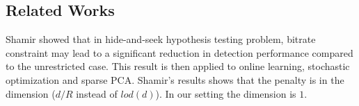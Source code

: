 \documentclass[letterpaper, conference]{IEEEtran}      %
\begin{document}
%


\subsection*{Related Works}
{\color{red} Shamir \cite{Shamir} showed that in hide-and-seek hypothesis testing problem, bitrate constraint may lead to a significant reduction in detection performance compared to the unrestricted case. This result is then applied to online learning, stochastic optimization and sparse PCA. Shamir's results shows that the penalty is in the dimension ($d/R$ instead of $lod(d)$). In our setting the dimension is $1$.} \\
\end{document}
